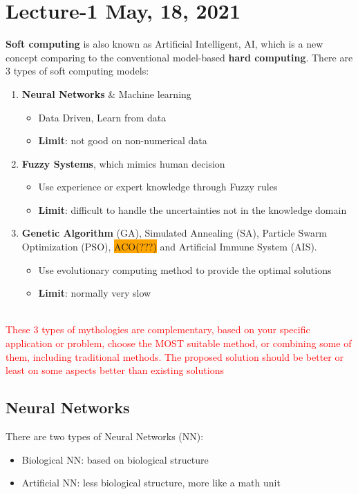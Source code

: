 \chapter{Lecture-1 May, 18, 2021}
\textbf{Soft computing} is also known as Artificial Intelligent, AI, which is a new concept comparing to the conventional model-based \textbf{hard computing}.
There are 3 types of soft computing models:
\begin{enumerate}
\item \textbf{Neural Networks} \& Machine learning
\begin{itemize}
\item Data Driven, Learn from data
\item \textbf{Limit}: not good on non-numerical data
\end{itemize}
\item \textbf{Fuzzy Systems}, which mimics human decision 
\begin{itemize}
\item Use experience or expert knowledge through Fuzzy rules
\item \textbf{Limit}: difficult to handle the uncertainties not in the knowledge domain
\end{itemize}
\item \textbf{Genetic Algorithm} (GA), Simulated Annealing (SA), Particle Swarm Optimization (PSO), \colorbox{Orange}{ACO(???)} and Artificial Immune System (AIS).
\begin{itemize}
\item Use evolutionary computing method to provide the optimal solutions
\item \textbf{Limit}: normally very slow
\end{itemize}
\end{enumerate}
\\
\textcolor{red} {These 3 types of mythologies are complementary, based on your specific application or problem, choose the MOST suitable method, or combining some of them, including traditional methods. The proposed solution should be better or least on some aspects better than existing solutions} 

\noindent{\color{red} \rule{\linewidth}{0.5mm}}
\section{Neural Networks}

There are two types of Neural Networks (NN):
\begin{itemize}
    \item Biological NN: based on biological structure
    \item Artificial NN: less biological structure, more like a math unit
\end{itemize}


